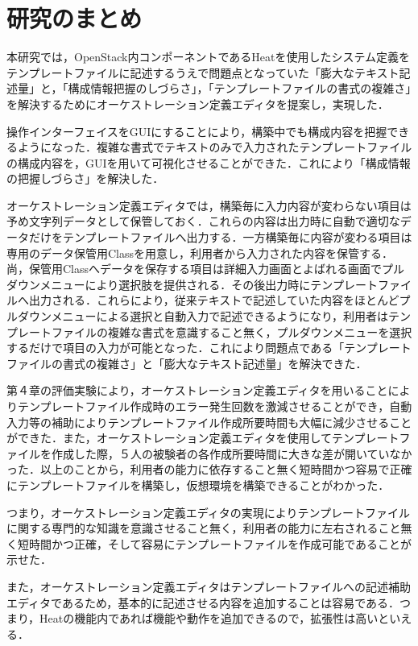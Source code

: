 \documentclass[mingoth]{kut-paper}		%
\begin{document}
	\section{研究のまとめ}
	本研究では，OpenStack内コンポーネントであるHeatを使用したシステム定義をテンプレートファイルに記述するうえで問題点となっていた「膨大なテキスト記述量」と，「構成情報把握のしづらさ」，「テンプレートファイルの書式の複雑さ」を解決するためにオーケストレーション定義エディタを提案し，実現した．
	
	操作インターフェイスをGUIにすることにより，構築中でも構成内容を把握できるようになった．複雑な書式でテキストのみで入力されたテンプレートファイルの構成内容を，GUIを用いて可視化させることができた．これにより「構成情報の把握しづらさ」を解決した．
	
	オーケストレーション定義エディタでは，構築毎に入力内容が変わらない項目は予め文字列データとして保管しておく．これらの内容は出力時に自動で適切なデータだけをテンプレートファイルへ出力する．一方構築毎に内容が変わる項目は専用のデータ保管用Classを用意し，利用者から入力された内容を保管する．尚，保管用Classへデータを保存する項目は詳細入力画面とよばれる画面でプルダウンメニューにより選択肢を提供される．その後出力時にテンプレートファイルへ出力される．これらにより，従来テキストで記述していた内容をほとんどプルダウンメニューによる選択と自動入力で記述できるようになり，利用者はテンプレートファイルの複雑な書式を意識すること無く，プルダウンメニューを選択するだけで項目の入力が可能となった．これにより問題点である「テンプレートファイルの書式の複雑さ」と「膨大なテキスト記述量」を解決できた．
	
	第４章の評価実験により，オーケストレーション定義エディタを用いることによりテンプレートファイル作成時のエラー発生回数を激減させることができ，自動入力等の補助によりテンプレートファイル作成所要時間も大幅に減少させることができた．また，オーケストレーション定義エディタを使用してテンプレートファイルを作成した際，５人の被験者の各作成所要時間に大きな差が開いていなかった．以上のことから，利用者の能力に依存すること無く短時間かつ容易で正確にテンプレートファイルを構築し，仮想環境を構築できることがわかった．
	
	つまり，オーケストレーション定義エディタの実現によりテンプレートファイルに関する専門的な知識を意識させること無く，利用者の能力に左右されること無く短時間かつ正確，そして容易にテンプレートファイルを作成可能であることが示せた．
	
	また，オーケストレーション定義エディタはテンプレートファイルへの記述補助エディタであるため，基本的に記述させる内容を追加することは容易である．つまり，Heatの機能内であれば機能や動作を追加できるので，拡張性は高いといえる．
\end{document}
